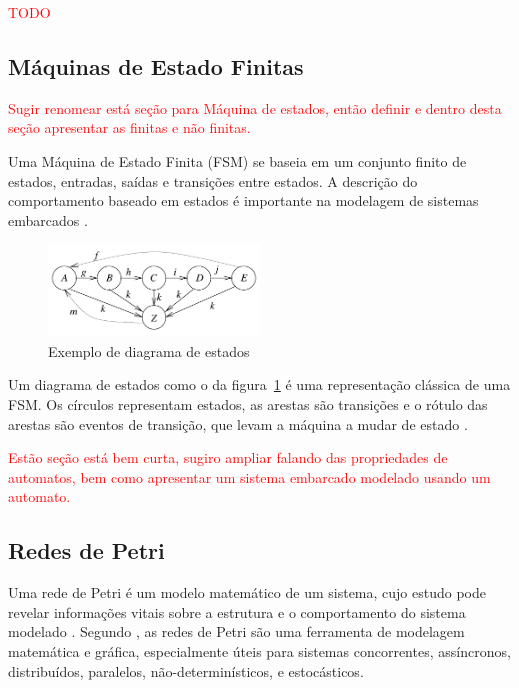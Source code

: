 \textcolor{red}{TODO}

\subsection{Máquinas de Estado Finitas}

\textcolor{red}{Sugir renomear está seção para Máquina de estados, então definir e dentro desta seção apresentar as  finitas e não finitas.}

Uma Máquina de Estado Finita (FSM) se baseia em um conjunto finito de estados, entradas, saídas e transições entre estados. A descrição do comportamento baseado em estados é importante na modelagem de sistemas embarcados \cite{marwedel:2010}.

\begin{figure}[h]
	\caption{\label{fig:fsm}Exemplo de diagrama de estados}
	\begin{center}
	    \includegraphics[width=0.5\textwidth]{resources/fsm_marwedel}
	\end{center}
\end{figure}

Um diagrama de estados como o da figura~\ref{fig:fsm} é uma representação clássica de uma FSM. Os círculos representam estados, as arestas são transições e o rótulo das arestas são eventos de transição, que levam a máquina a mudar de estado \cite{marwedel:2010}.

\textcolor{red}{Estão seção está bem curta, sugiro ampliar falando das propriedades de automatos, bem como apresentar um sistema embarcado modelado usando um automato.}

\subsection{Redes de Petri}
Uma rede de Petri é um modelo matemático de um sistema, cujo estudo pode revelar informações vitais sobre a estrutura e o comportamento do sistema modelado \cite{peterson:1981}. Segundo , as redes de Petri são uma ferramenta de modelagem matemática e gráfica, especialmente úteis para sistemas concorrentes, assíncronos, distribuídos, paralelos, não-determinísticos, e estocásticos.

